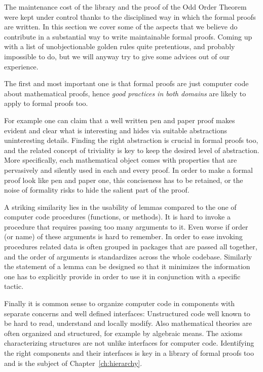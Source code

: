 The maintenance cost of the  \mcbMC{} library and the proof of the
Odd Order Theorem were kept under control thanks to the disciplined
way in which the formal proofs are written.
In this section we cover some of the aspects that we believe do
contribute in a substantial way to write maintainable formal proofs.
Coming up with a list of unobjectionable golden rules quite pretentious,
and probably impossible to do, but we will anyway try to give some
advices out of our experience. 

The first and most important one is that formal proofs are just computer code
about mathematical proofs, hence \emph{good practices in both domains}
are likely to apply to formal proofs too.

For example one can claim that a well written pen and paper proof makes evident
and clear what is interesting and hides via suitable abstractions uninteresting
details. Finding the right abstraction is crucial in formal proofs too, and the
related concept of triviality is key to keep the desired level of abstraction.
More specifically, each mathematical object comes with properties that are
pervasively and silently used in each and every proof. In order to make a
formal proof look like pen and paper one, this conciseness has to be retained,
or the noise of formality risks to hide the salient part of the proof.

A striking similarity lies in the usability of lemmas
compared to the one of computer code procedures (functions, or methods).
It is hard to invoke a procedure that requires
passing too many arguments to it. Even worse if order (or name)
of these arguments is hard to remember.
In order to ease invoking procedures related data is often
grouped in packages that are passed all together,
and the order of arguments is standardizes across the whole codebase.
Similarly the statement of a lemma can be designed so that it
minimizes the information one has to explicitly provide
in order to use it in conjunction with a specific tactic.

Finally it is common sense to organize computer code
in components with separate concerns and well defined interfaces:
Unstructured code well known to be hard to read, understand and
locally modify.
Also mathematical theories are often organized and structured, for
example by algebraic means. The axioms characterizing structures
are not unlike interfaces for computer code.
Identifying the right components and their interfaces is key in a library of
formal proofs too and is the subject of Chapter~\ref{ch:hierarchy}.

